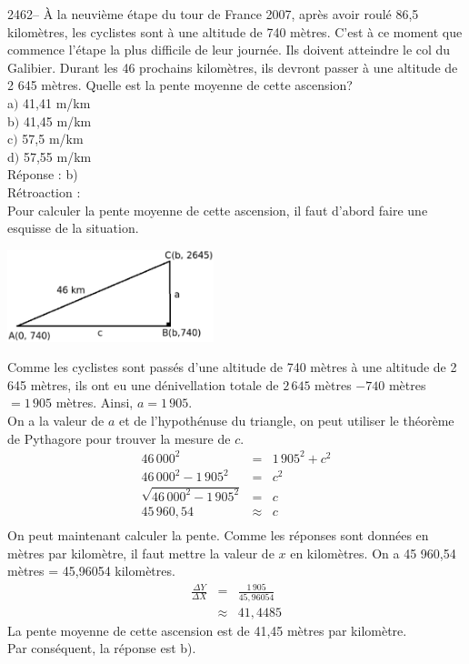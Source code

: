 \documentclass[letterpaper, 12pt]{article}
\begin{document}

2462-- \`A la neuvi\`eme \'etape du tour de France 2007, apr\`es avoir roul\'e 86,5 kilom\`etres, les cyclistes sont \`a une altitude de 740 m\`etres. C'est \`a ce moment que commence l'\'etape la plus difficile de leur journ\'ee. Ils doivent atteindre le col du Galibier. Durant les 46 prochains kilom\`etres, ils devront passer \`a une altitude de 2 645 m\`etres. Quelle est la pente moyenne de cette ascension?\\

a$)$ 41,41 m/km\\
b$)$ 41,45 m/km\\
c$)$ 57,5 m/km\\
d$)$ 57,55 m/km\\

R\'eponse : b)\\

R\'etroaction :\\
Pour calculer la pente moyenne de cette ascension, il faut d'abord faire une esquisse de la situation.
\begin{center}
 \includegraphics[width=6cm,bb=0 520 566 842]{Q2462.eps}
\end{center}
Comme les cyclistes sont pass\'es d'une altitude de 740 m\`etres \`a une altitude de 2 645 m\`etres, ils ont eu une d\'enivellation totale de $2\,645$ m\`etres $-740$ m\`etres$=1\,905$ m\`etres. Ainsi, $a=1\,905$.\\
On a la valeur de $a$ et de l'hypoth\'enuse du triangle, on peut utiliser le th\'eor\`eme de Pythagore pour trouver la mesure de $c$.
\begin{eqnarray*}
 46\,000^{2}&=&1\,905^{2}+c^{2}\\
 46\,000^{2}-1\,905^{2}&=&c^{2}\\
 \sqrt{46\,000^{2}-1\,905^{2}}&=&c\\
45\,960,54&\approx&c\\
\end{eqnarray*}
 On peut maintenant calculer la pente. Comme les r\'eponses sont donn\'ees en m\`etres par kilom\`etre, il faut mettre la valeur de $x$ en kilom\`etres. On a 45 960,54 m\`etres = 45,96054 kilom\`etres.
\begin{eqnarray*}
 \frac{\Delta Y}{\Delta X}&=&\frac{1\,905}{45,96054}\\[2mm]
&\approx&41,4485
\end{eqnarray*}
La pente moyenne de cette ascension est de 41,45 m\`etres par kilom\`etre.\\
Par cons\'equent, la r\'eponse est b).\\
\end{document}
